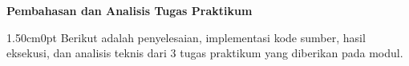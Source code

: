 \documentclass[12pt,a4paper]{article}
\begin{document}
\vspace{0.25cm}
{}
\noindent\hspace*{0.75cm}\textbf{\normalsize Pembahasan dan Analisis Tugas Praktikum}\par
\vspace{0.12cm}

\begin{adjustwidth}{1.50cm}{0pt}
\hspace*{0.85cm}Berikut adalah penyelesaian, implementasi kode sumber, hasil eksekusi, dan analisis teknis dari 3 tugas praktikum yang diberikan pada modul.
\end{adjustwidth}

\newpage
{}
\end{document}
